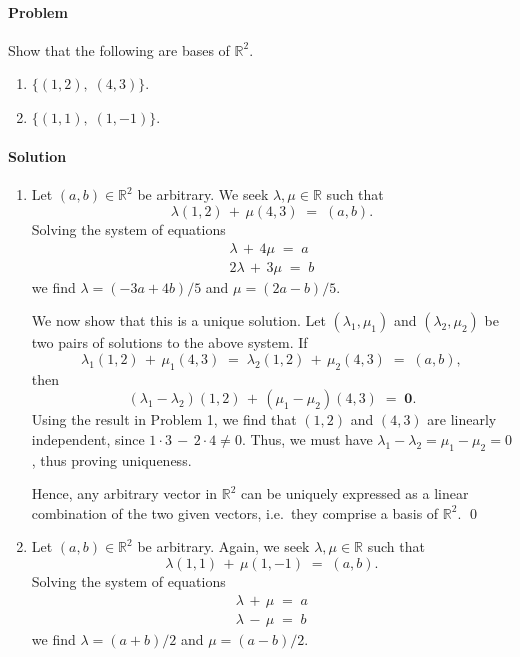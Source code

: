 \documentclass[10pt]{article}
\newcounter{prob}
\def\problem{\stepcounter{prob}\paragraph{Problem \arabic{prob}}}
\def\solution{\paragraph{Solution}}
\let\vec\mathbf
\begin{document}
        \problem Show that the following are bases of $\mathbb{R}^2$.
                \begin{enumerate}
                        \item $\{(1, 2),\;(4, 3) \}$.
                        \item $\{(1, 1),\;(1, -1) \}$.
                \end{enumerate}
        \solution
        \begin{enumerate}
                \item Let $(a, b) \in \mathbb{R}^2$ be arbitrary. We seek $\lambda, \mu \in \mathbb{R}$ such that
                \[
                        \lambda(1, 2) \,+\, \mu(4, 3) \;=\; (a, b).
                \]
                Solving the system of equations
                \begin{align*}
                \lambda \,+\, 4\mu \;=\; a \\
                2\lambda \,+\, 3\mu \;=\; b
                \end{align*}
                we find $\lambda = (-3a + 4b)/5$ and $\mu = (2a - b)/5$.
                
                We now show that this is a unique solution. Let $(\lambda_1, \mu_1)$ and $(\lambda_2, \mu_2)$ be two pairs of solutions
                to the above system. If
                \[
                \lambda_1(1, 2) \,+\, \mu_1(4, 3) \;=\; \lambda_2(1, 2) \,+\, \mu_2(4, 3) \;=\; (a, b),
                \]
                then 
                \[
                (\lambda_1 - \lambda_2)(1, 2) \,+\, (\mu_1 - \mu_2)(4, 3) \;=\; \vec{0}.
                \]
                Using the result in Problem 1, we find that $(1, 2)$ and $(4, 3)$ are linearly independent, since $1\cdot 3 \,-\, 2\cdot 4\neq 0$.
                Thus, we must have $\lambda_1 - \lambda_2 = \mu_1 - \mu_2 = 0$, thus proving uniqueness.

                Hence, any arbitrary vector in $\mathbb{R}^2$ can be uniquely expressed as a linear combination of the two given vectors, i.e.\ 
                they comprise a basis of $\mathbb{R}^2$. \qed

                \item Let $(a, b) \in \mathbb{R}^2$ be arbitrary. Again, we seek $\lambda, \mu \in \mathbb{R}$ such that
                \[
                        \lambda(1, 1) \,+\, \mu(1, -1) \;=\; (a, b).
                \]
                Solving the system of equations
                \begin{align*}
                \lambda \,+\, \mu \;=\; a \\
                \lambda \,-\, \mu \;=\; b
                \end{align*}
                we find $\lambda = (a + b)/2$ and $\mu = (a - b)/2$.
                

\end{enumerate}
\end{document}
